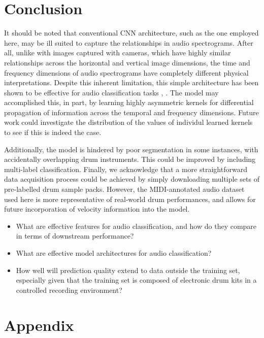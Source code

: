 \documentclass[twocolumn]{article}
\begin{document}
\section{Conclusion}

It should be noted that conventional CNN architecture, such as the one employed here, may be ill suited to capture the relationships in audio spectrograms.
After all, unlike with images captured with cameras, which have highly similar relationships across the horizontal and vertical image dimensions, the time and frequency dimensions of audio spectrograms have completely different physical interpretations.
Despite this inherent limitation, this simple architecture has been shown to be effective for audio classification tasks \cite{piczak_environmental_2015}, \cite{hershey_cnn_2017}.
The model may accomplished this, in part, by learning highly asymmetric kernels for differential propagation of information across the temporal and frequency dimensions.
Future work could investigate the distribution of the values of individul learned kernels to see if this is indeed the case.

Additionally, the model is hindered by poor segmentation in some instances, with accidentally overlapping drum instruments.
This could be improved by including multi-label classification.
Finally, we acknowledge that a more straightforward data acquisition process could be achieved by simply downloading multiple sets of pre-labelled drum sample packs.
However, the MIDI-annotated audio dataset used here is more representative of real-world drum performances, and allows for future incorporation of velocity information into the model.

\begin{itemize}
    \item What are effective features for audio classification, and how do they compare in terms of downstream performance?
    \item What are effective model architectures for audio classification?
    \item How well will prediction quality extend to data outside the training set, especially given that the training set is composed of electronic drum kits in a controlled recording environment?
\end{itemize}

\section{Appendix}
\end{document}
